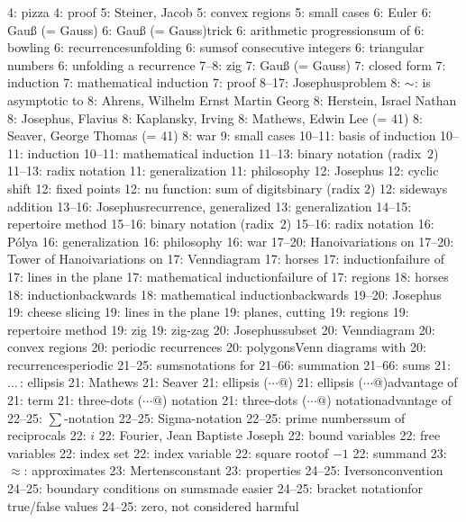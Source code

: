   4: pizza
  4: proof
  5: Steiner, Jacob
  5: convex regions
  5: small cases
  6: Euler
  6: Gau{\ss} (= Gauss)
  6: Gau{\ss} (= Gauss)\sub trick
  6: arithmetic progression\sub sum of
  6: bowling
  6: recurrences\sub unfolding
  6: sums\sub of consecutive integers
  6: triangular numbers
  6: unfolding a recurrence
  7--8: zig
  7: Gau{\ss} (= Gauss)
  7: closed form
  7: induction
  7: mathematical induction
  7: proof
  8--17: Josephus\sub problem
  8: $\sim$: is asymptotic to
  8: Ahrens, Wilhelm Ernst Martin Georg
  8: Herstein, Israel Nathan
  8: Josephus, Flavius
  8: Kaplansky, Irving
  8: Mathews, Edwin Lee (= 41)
  8: Seaver, George Thomas (= 41)
  8: war
  9: small cases
 10--11: basis of induction
 10--11: induction
 10--11: mathematical induction
 11--13: binary notation (radix~$2$)
 11--13: radix notation
 11: generalization
 11: philosophy
 12: Josephus
 12: cyclic shift
 12: fixed points
 12: nu function: sum of digits\sub binary (radix $2$)
 12: sideways addition
 13--16: Josephus\sub recurrence, generalized
 13: generalization
 14--15: repertoire method
 15--16: binary notation (radix~$2$)
 15--16: radix notation
 16: P\'olya
 16: generalization
 16: philosophy
 16: war
 17--20: Hanoi\sub variations on
 17--20: Tower of Hanoi\sub variations on
 17: Venn\sub diagram
 17: horses
 17: induction\sub failure of
 17: lines in the plane
 17: mathematical induction\sub failure of
 17: regions
 18: horses
 18: induction\sub backwards
 18: mathematical induction\sub backwards
 19--20: Josephus
 19: cheese slicing
 19: lines in the plane
 19: planes, cutting
 19: regions
 19: repertoire method
 19: zig
 19: zig-zag
 20: Josephus\sub subset
 20: Venn\sub diagram
 20: convex regions
 20: periodic recurrences
 20: polygons\sub Venn diagrams with
 20: recurrences\sub periodic
 21--25: sums\sub notations for
 21--66: summation
 21--66: sums
 21: $\ldots\,$: ellipsis
 21: Mathews
 21: Seaver
 21: ellipsis ($\cdots@$)
 21: ellipsis ($\cdots@$)\sub advantage of
 21: term
 21: three-dots ($\cdots@$) notation
 21: three-dots ($\cdots@$) notation\sub advantage of
 22--25: $\sum$-notation
 22--25: Sigma-notation
 22--25: prime numbers\sub sum of reciprocals
 22: $i$
 22: Fourier, Jean Baptiste Joseph
 22: bound variables
 22: free variables
 22: index set
 22: index variable
 22: square root\sub of $-1$
 22: summand
 23: $\approx$: approximates
 23: Mertens\sub constant
 23: properties
 24--25: Iverson\sub convention
 24--25: boundary conditions on sums\sub made easier
 24--25: bracket notation\sub for true/false values
 24--25: zero, not considered harmful

